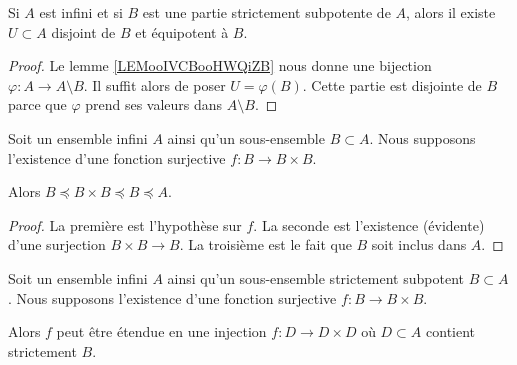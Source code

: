 \begin{lemma}        \label{LEMooMRVQooUZSSyL}
	Si \( A\) est infini et si \( B\) est une partie strictement subpotente de \( A\), alors il existe \( U\subset A\) disjoint de \( B\) et équipotent à \( B\).
\end{lemma}

\begin{proof}
	Le lemme \ref{LEMooIVCBooHWQiZB} nous donne une bijection \( \varphi\colon A\to A\setminus B\). Il suffit alors de poser \( U=\varphi(B)\). Cette partie est disjointe de \( B\) parce que \( \varphi\) prend ses valeurs dans \( A\setminus B\).
\end{proof}

\begin{lemma}
	Soit un ensemble infini \( A\) ainsi qu'un sous-ensemble \( B\subset A\). Nous supposons l'existence d'une fonction surjective \( f\colon B\to B\times B\).

	Alors \( B\preceq B\times B\preceq B\preceq A\).
\end{lemma}

\begin{proof}
	La première est l'hypothèse sur \( f\). La seconde est l'existence (évidente) d'une surjection \( B\times B\to B\). La troisième est le fait que \( B\) soit inclus dans \( A\).
\end{proof}

\begin{lemma}     \label{LEMooPOEFooXaifhT}
	Soit un ensemble infini \( A\) ainsi qu'un sous-ensemble strictement subpotent \( B\subset A\). Nous supposons l'existence d'une fonction surjective \( f\colon B\to B\times B\).

	Alors \( f\) peut être étendue en une injection \( f\colon D\to D\times D\) où \( D\subset A\) contient strictement \( B\).
\end{lemma}


